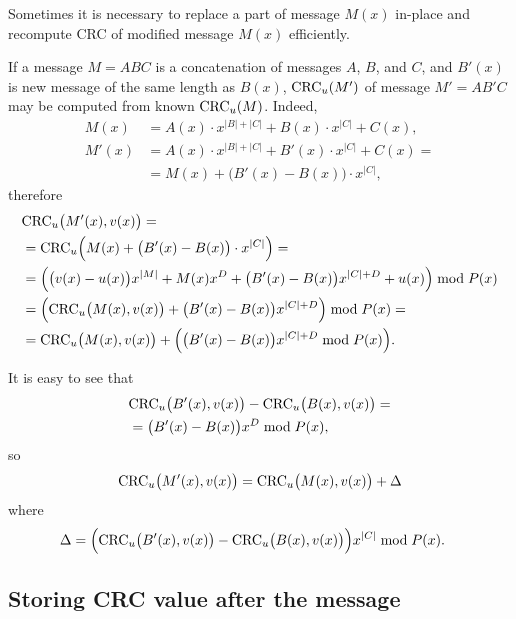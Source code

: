 \documentclass{article}
\begin{document}
Sometimes it is necessary to replace a part of message $M(x)$ in-place and
recompute CRC of modified message $M(x)$ efficiently.

If a message $M=ABC$ is a concatenation of messages $A$, $B$, and $C$, and
$B'(x)$ is new message of the same length as $B(x)$, ${\rm CRC}_u(M')$ of message
$M'=AB'C$ may be computed from known ${\rm CRC}_u(M)$. Indeed,
  \begin{align*}
    M(x)  &= A(x) \cdot x^{|B| + |C|} + B(x) \cdot x^{|C|} + C(x), \\
    M'(x) &= A(x) \cdot x^{|B| + |C|} + B'(x) \cdot x^{|C|} + C(x) = \\
          &= M(x) + \bigl(B'(x) - B(x)\bigr) \cdot x^{|C|},
  \end{align*}
therefore
  \begin{align*}
    &  {\rm CRC}_u\bigl(M'(x),v(x)\bigr) = \\
    &= {\rm CRC}_u\Bigl(M(x) +\bigl(B'(x) - B(x)\bigr) \cdot x^{|C|}\Bigr) = \\
    &= \Bigl(\bigl(v(x)-u(x)\bigr) x^{|M|} + M(x) x^D + \bigl(B'(x) - B(x)\bigr) x^{|C| + D} + u(x)\Bigr) \bmod P(x) \\
    &= \Bigl({\rm CRC}_u\bigl(M(x),v(x)\bigr) + \bigl(B'(x) - B(x)\bigr) x^{|C| + D}\Bigr) \bmod P(x) = \\
    &= {\rm CRC}_u\bigl(M(x),v(x)\bigr) + \Bigl(\bigl(B'(x) - B(x)\bigr) x^{|C| + D} \bmod P(x)\Bigr).
  \end{align*}

It is easy to see that
  \begin{align*}
    &  {\rm CRC}_u\bigl(B'(x),v(x)\bigr) - {\rm CRC}_u\bigl(B(x),v(x)\bigr) = \\
    &= \bigl(B'(x) - B(x)\bigr) x^{D} \bmod P(x),
  \end{align*}
so
  \begin{align*}
    & {\rm CRC}_u\bigl(M'(x),v(x)\bigr) = {\rm CRC}_u\bigl(M(x),v(x)\bigr) + \Delta \\
  \end{align*}
where
  \begin{align*}
    & \Delta = \Bigl({\rm CRC}_u\bigl(B'(x),v(x)\bigr) - {\rm CRC}_u\bigl(B(x),v(x)\bigr) \Bigr) x^{|C|} \bmod P(x).
  \end{align*}

\subsection{Storing CRC value after the message} \label{s:storingcrcafter}
\end{document}
